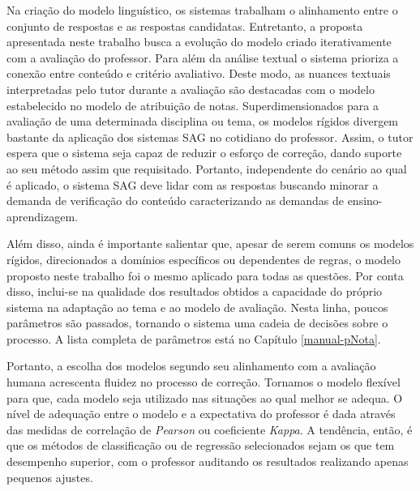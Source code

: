 Na criação do modelo linguístico, os sistemas trabalham o alinhamento entre o conjunto de respostas e as respostas candidatas. Entretanto, a proposta apresentada neste trabalho busca a evolução do modelo criado iterativamente com a avaliação do professor. Para além da análise textual o sistema prioriza a conexão entre conteúdo e critério avaliativo. Deste modo, as nuances textuais interpretadas pelo tutor durante a avaliação são destacadas com o modelo estabelecido no modelo de atribuição de notas. Superdimensionados para a avaliação de uma determinada disciplina ou tema, os modelos rígidos divergem bastante da aplicação dos sistemas SAG no cotidiano do professor. Assim, o tutor espera que o sistema seja capaz de reduzir o esforço de correção, dando suporte ao seu método assim que requisitado. Portanto, independente do cenário ao qual é aplicado, o sistema SAG deve lidar com as respostas buscando minorar a demanda de verificação do conteúdo caracterizando as demandas de ensino-aprendizagem.

Além disso, ainda é importante salientar que, apesar de serem comuns os modelos rígidos, direcionados a domínios específicos ou dependentes de regras, o modelo proposto neste trabalho foi o mesmo aplicado para todas as questões. Por conta disso, inclui-se na qualidade dos resultados obtidos a capacidade do próprio sistema na adaptação ao tema e ao modelo de avaliação. Nesta linha, poucos parâmetros são passados, tornando o sistema uma cadeia de decisões sobre o processo. A lista completa de parâmetros está no Capítulo \ref{manual-pNota}.

Portanto, a escolha dos modelos segundo seu alinhamento com a avaliação humana acrescenta fluidez no processo de correção. Tornamos o modelo flexível para que, cada modelo seja utilizado nas situações ao qual melhor se adequa. O nível de adequação entre o modelo e a expectativa do professor é dada através das medidas de correlação de \textit{Pearson} ou coeficiente \textit{Kappa}. A tendência, então, é que os métodos de classificação ou de regressão selecionados sejam os que tem desempenho superior, com o professor auditando os resultados realizando apenas pequenos ajustes.